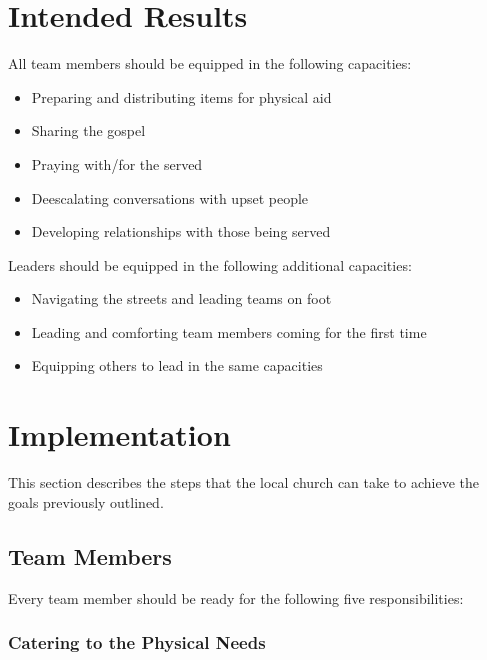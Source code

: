 \documentclass[12pt]{article}
\begin{document}

\qJamesOneTwentySeven

\section{Intended Results}

    All team members should be equipped in the following capacities:
    \begin{itemize}
        \item Preparing and distributing items for physical aid
        \item Sharing the gospel
        \item Praying with/for the served
        \item Deescalating conversations with upset people
        \item Developing relationships with those being served
    \end{itemize}

    Leaders should be equipped in the following additional capacities:
    \begin{itemize}
        \item Navigating the streets and leading teams on foot
        \item Leading and comforting team members coming for the first time
        \item Equipping others to lead in the same capacities
    \end{itemize}


\section{Implementation}

This section describes the steps that the local church can take to achieve the goals previously outlined.

\subsection{Team Members}

    Every team member should be ready for the following five responsibilities:

\subsubsection{Catering to the Physical Needs}
\end{document}
